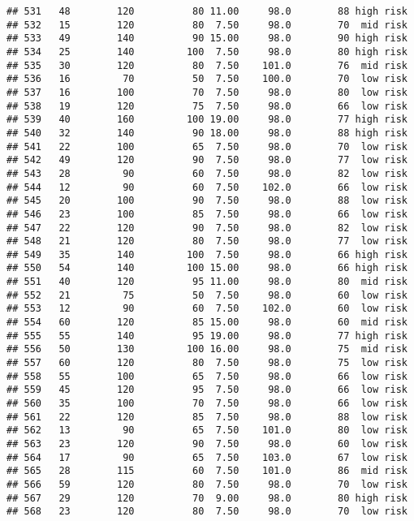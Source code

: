 \documentclass[
  ignorenonframetext,
]{beamer}
\begin{document}
\begin{frame}[fragile]
\begin{verbatim}
## 531   48        120          80 11.00     98.0        88 high risk
## 532   15        120          80  7.50     98.0        70  mid risk
## 533   49        140          90 15.00     98.0        90 high risk
## 534   25        140         100  7.50     98.0        80 high risk
## 535   30        120          80  7.50    101.0        76  mid risk
## 536   16         70          50  7.50    100.0        70  low risk
## 537   16        100          70  7.50     98.0        80  low risk
## 538   19        120          75  7.50     98.0        66  low risk
## 539   40        160         100 19.00     98.0        77 high risk
## 540   32        140          90 18.00     98.0        88 high risk
## 541   22        100          65  7.50     98.0        70  low risk
## 542   49        120          90  7.50     98.0        77  low risk
## 543   28         90          60  7.50     98.0        82  low risk
## 544   12         90          60  7.50    102.0        66  low risk
## 545   20        100          90  7.50     98.0        88  low risk
## 546   23        100          85  7.50     98.0        66  low risk
## 547   22        120          90  7.50     98.0        82  low risk
## 548   21        120          80  7.50     98.0        77  low risk
## 549   35        140         100  7.50     98.0        66 high risk
## 550   54        140         100 15.00     98.0        66 high risk
## 551   40        120          95 11.00     98.0        80  mid risk
## 552   21         75          50  7.50     98.0        60  low risk
## 553   12         90          60  7.50    102.0        60  low risk
## 554   60        120          85 15.00     98.0        60  mid risk
## 555   55        140          95 19.00     98.0        77 high risk
## 556   50        130         100 16.00     98.0        75  mid risk
## 557   60        120          80  7.50     98.0        75  low risk
## 558   55        100          65  7.50     98.0        66  low risk
## 559   45        120          95  7.50     98.0        66  low risk
## 560   35        100          70  7.50     98.0        66  low risk
## 561   22        120          85  7.50     98.0        88  low risk
## 562   13         90          65  7.50    101.0        80  low risk
## 563   23        120          90  7.50     98.0        60  low risk
## 564   17         90          65  7.50    103.0        67  low risk
## 565   28        115          60  7.50    101.0        86  mid risk
## 566   59        120          80  7.50     98.0        70  low risk
## 567   29        120          70  9.00     98.0        80 high risk
## 568   23        120          80  7.50     98.0        70  low risk

\end{verbatim}
\end{frame}
\end{document}
